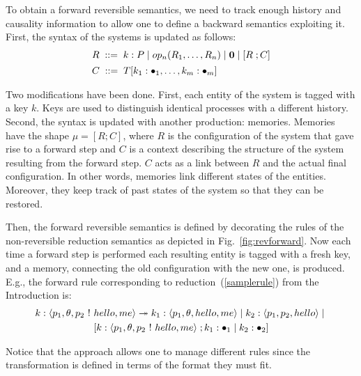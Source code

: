 \documentclass{article}[12pt,a4paper]
\theoremstyle{definition}
\newcommand{\paral}{\;|\;}
\begin{document}
To obtain a forward reversible semantics, we need to track enough history and causality information to allow one to define a backward semantics exploiting it. First, the syntax of the
systems is updated as follows:\\
\[
\begin{array}{l}
  R   \; ::=\;  k:P \paral \op(R_1,\ldots,R_n)\paral \nil \paral \mem{R}{\str} \\[1ex]
  \str \; ::= \; T[k_1:\blt_1,\dots,k_m:\blt_m]
\end{array}
\]

Two modifications have been done. First, each entity of the system is tagged with
a key $k$. Keys are used to distinguish identical processes with a different
history. Second, the syntax is updated with another production: memories. Memories have
the shape $\mu=[R;C]$, where $R$ is the configuration of the
system that gave rise to a forward step and $C$ is a context describing the structure of the system resulting from the forward step.
$C$ acts as a link between $R$ and the actual final configuration. In
other words, memories link different states of the entities. Moreover, they keep
track of past states of the system so that they can be restored.

Then, the forward reversible semantics is defined by decorating the rules of the non-reversible reduction semantics as depicted in
Fig.~\ref{fig:revforward}. Now each time a forward step is performed each resulting entity is tagged with a fresh
key, and a memory, connecting the old configuration with the new one, is produced.
E.g., the forward rule corresponding to reduction~(\ref{samplerule}) from the Introduction is:
\begin{multline*}
k:\langle p_1, \theta, p_2~\ms{!}~hello, me\rangle \flts{} k_1:\langle p_1, \theta,
hello, me\rangle \paral k_2: \langle p_1, p_2,hello \rangle \paral\\ \mem{k:\langle p_1, \theta, p_2~\ms{!}~hello, me\rangle}{k_1:\bullet_1 \paral k_2:\bullet_2}
\end{multline*}

Notice that the approach allows one to manage different rules since the transformation is defined in terms of the format they must fit.
\end{document}
